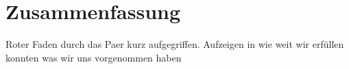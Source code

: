 \chapter{Zusammenfassung}
\label{conclusion}

Roter Faden durch das Paer kurz aufgegriffen. Aufzeigen in wie weit wir erfüllen konnten was wir uns vorgenommen haben
